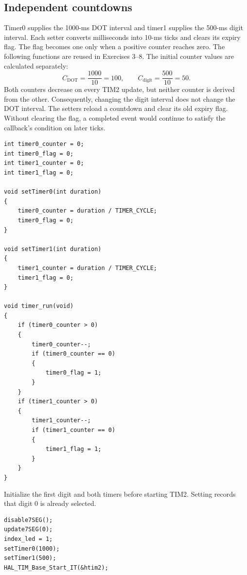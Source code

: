 \documentclass[a4paper]{article}
\newcommand{\code}[1]{\texttt{\detokenize{#1}}}
\newcommand{\topic}[1]{\subsection{#1}}
\begin{document}
\topic{Independent countdowns}
Timer0 supplies the 1000-ms DOT interval and timer1 supplies the 500-ms digit
interval. Each setter converts milliseconds into 10-ms ticks and clears its
expiry flag. The flag becomes one only when a positive counter reaches zero.
The following functions are reused in Exercises 3--8.
The initial counter values are calculated separately:
\[
C_{\mathrm{DOT}}=\frac{1000}{10}=100,\qquad
C_{\mathrm{digit}}=\frac{500}{10}=50.
\]
Both counters decrease on every TIM2 update, but neither counter is derived
from the other. Consequently, changing the digit interval does not change the
DOT interval. The setters reload a countdown and clear its old expiry flag.
Without clearing the flag, a completed event would continue to satisfy the
callback's condition on later ticks.
\par\noindent\begin{minipage}{\linewidth}
\begin{lstlisting}[caption={Two simple software timers}]
int timer0_counter = 0;
int timer0_flag = 0;
int timer1_counter = 0;
int timer1_flag = 0;

void setTimer0(int duration)
{
    timer0_counter = duration / TIMER_CYCLE;
    timer0_flag = 0;
}

void setTimer1(int duration)
{
    timer1_counter = duration / TIMER_CYCLE;
    timer1_flag = 0;
}

void timer_run(void)
{
    if (timer0_counter > 0)
    {
        timer0_counter--;
        if (timer0_counter == 0)
        {
            timer0_flag = 1;
        }
    }
    if (timer1_counter > 0)
    {
        timer1_counter--;
        if (timer1_counter == 0)
        {
            timer1_flag = 1;
        }
    }
}
\end{lstlisting}
\end{minipage}\par
Initialize the first digit and both timers before starting TIM2. Setting
\code{index_led = 1} records that digit 0 is already selected.
\par\noindent\begin{minipage}{\linewidth}
\begin{lstlisting}[caption={Four-digit application initialization}]
disable7SEG();
update7SEG(0);
index_led = 1;
setTimer0(1000);
setTimer1(500);
HAL_TIM_Base_Start_IT(&htim2);
\end{lstlisting}
\end{minipage}\par
\end{document}
